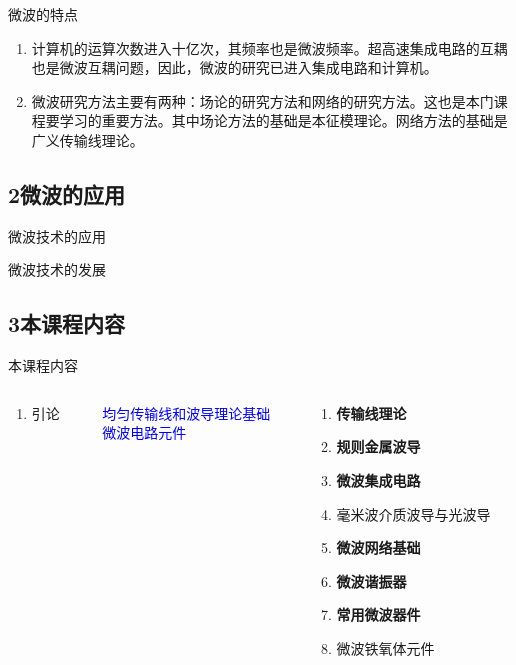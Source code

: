 \documentclass{beamer}
\newcounter{savedenum}
\newcommand*{\saveenum}{\setcounter{savedenum}{\theenumi}}
\newcommand*{\resume}{\setcounter{enumi}{\thesavedenum}}
\begin{document}
\begin{frame}{微波的特点}
  \begin{enumerate}
    \resume
    \item 计算机的运算次数进入十亿次，其频率也是微波频率。超高速集成电路的互耦也是微波互耦问题，因此，微波的研究已进入集成电路和计算机。
    \item 微波研究方法主要有两种：场论的研究方法和网络的研究方法。这也是本门课程要学习的重要方法。其中场论方法的基础是本征模理论。网络方法的基础是广义传输线理论。
  \end{enumerate}
\end{frame}

\subsection{2\quad 微波的应用}
\begin{frame}{微波技术的应用}
\end{frame}

\begin{frame}{微波技术的发展}

\end{frame}

\subsection{3\quad 本课程内容}
\begin{frame}{本课程内容}
  \begin{columns}
    \begin{column}{0.15\linewidth}
      \begin{enumerate}
        \item 引论
        \saveenum
      \end{enumerate}
    \end{column}
    \begin{column}{0.35\linewidth}
      \textcolor{blue}{均匀传输线和波导理论基础}\\
      \textcolor{blue}{微波电路元件}
    \end{column}
    \begin{column}{0.5\linewidth}
      \begin{enumerate}
        \resume
        \item \textbf{传输线理论}
        \item \textbf{规则金属波导}
        \item \textbf{微波集成电路}
        \item 毫米波介质波导与光波导
        \item \textbf{微波网络基础}
        \item \textbf{微波谐振器}
        \item \textbf{常用微波器件}
        \item 微波铁氧体元件
      \end{enumerate}
    \end{column}
  \end{columns}
\end{frame}
\end{document}
